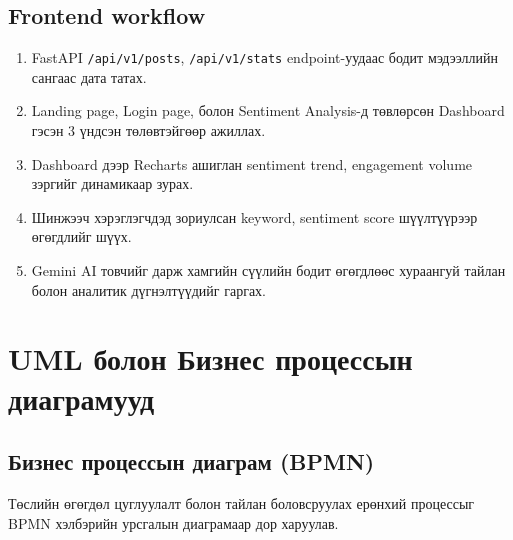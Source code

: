 \documentclass[
12pt,
oneside,
english,
onehalfspacing,
nolistspacing,
headsepline,
]{MUST-Thesis}
\begin{document}
\subsection{Frontend workflow}
\begin{enumerate}
    \item FastAPI \texttt{/api/v1/posts}, \texttt{/api/v1/stats} endpoint-уудаас бодит мэдээллийн сангаас дата татах.
    \item Landing page, Login page, болон Sentiment Analysis-д төвлөрсөн Dashboard гэсэн 3 үндсэн төлөвтэйгөөр ажиллах.
    \item Dashboard дээр Recharts ашиглан sentiment trend, engagement volume зэргийг динамикаар зурах.
    \item Шинжээч хэрэглэгчдэд зориулсан keyword, sentiment score шүүлтүүрээр өгөгдлийг шүүх.
    \item Gemini AI товчийг дарж хамгийн сүүлийн бодит өгөгдлөөс хураангуй тайлан болон аналитик дүгнэлтүүдийг гаргах.
\end{enumerate}

\section{UML болон Бизнес процессын диаграмууд}

\subsection{Бизнес процессын диаграм (BPMN)}
Төслийн өгөгдөл цуглуулалт болон тайлан боловсруулах ерөнхий процессыг BPMN хэлбэрийн урсгалын диаграмаар дор харуулав.
\end{document}
